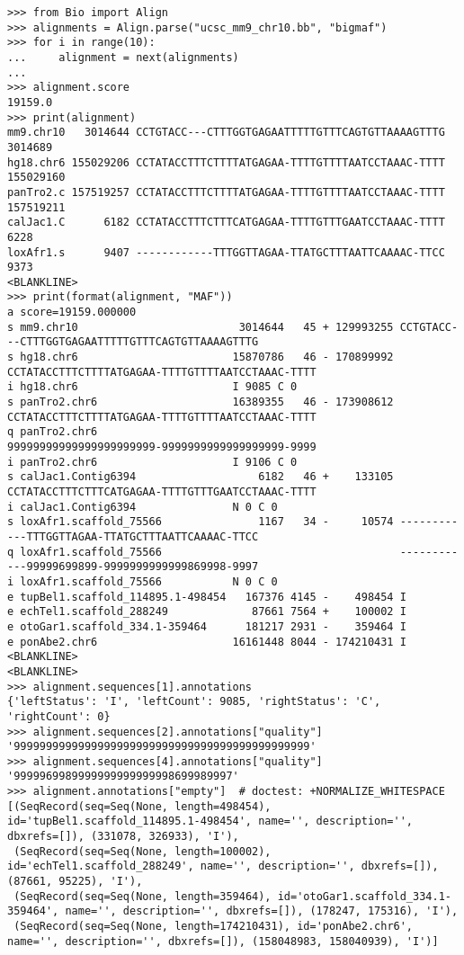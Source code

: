 \begin{verbatim}
>>> from Bio import Align
>>> alignments = Align.parse("ucsc_mm9_chr10.bb", "bigmaf")
>>> for i in range(10):
...     alignment = next(alignments)
...
>>> alignment.score
19159.0
>>> print(alignment)
mm9.chr10   3014644 CCTGTACC---CTTTGGTGAGAATTTTTGTTTCAGTGTTAAAAGTTTG   3014689
hg18.chr6 155029206 CCTATACCTTTCTTTTATGAGAA-TTTTGTTTTAATCCTAAAC-TTTT 155029160
panTro2.c 157519257 CCTATACCTTTCTTTTATGAGAA-TTTTGTTTTAATCCTAAAC-TTTT 157519211
calJac1.C      6182 CCTATACCTTTCTTTCATGAGAA-TTTTGTTTGAATCCTAAAC-TTTT      6228
loxAfr1.s      9407 ------------TTTGGTTAGAA-TTATGCTTTAATTCAAAAC-TTCC      9373
<BLANKLINE>
>>> print(format(alignment, "MAF"))
a score=19159.000000
s mm9.chr10                         3014644   45 + 129993255 CCTGTACC---CTTTGGTGAGAATTTTTGTTTCAGTGTTAAAAGTTTG
s hg18.chr6                        15870786   46 - 170899992 CCTATACCTTTCTTTTATGAGAA-TTTTGTTTTAATCCTAAAC-TTTT
i hg18.chr6                        I 9085 C 0
s panTro2.chr6                     16389355   46 - 173908612 CCTATACCTTTCTTTTATGAGAA-TTTTGTTTTAATCCTAAAC-TTTT
q panTro2.chr6                                               99999999999999999999999-9999999999999999999-9999
i panTro2.chr6                     I 9106 C 0
s calJac1.Contig6394                   6182   46 +    133105 CCTATACCTTTCTTTCATGAGAA-TTTTGTTTGAATCCTAAAC-TTTT
i calJac1.Contig6394               N 0 C 0
s loxAfr1.scaffold_75566               1167   34 -     10574 ------------TTTGGTTAGAA-TTATGCTTTAATTCAAAAC-TTCC
q loxAfr1.scaffold_75566                                     ------------99999699899-9999999999999869998-9997
i loxAfr1.scaffold_75566           N 0 C 0
e tupBel1.scaffold_114895.1-498454   167376 4145 -    498454 I
e echTel1.scaffold_288249             87661 7564 +    100002 I
e otoGar1.scaffold_334.1-359464      181217 2931 -    359464 I
e ponAbe2.chr6                     16161448 8044 - 174210431 I
<BLANKLINE>
<BLANKLINE>
>>> alignment.sequences[1].annotations
{'leftStatus': 'I', 'leftCount': 9085, 'rightStatus': 'C', 'rightCount': 0}
>>> alignment.sequences[2].annotations["quality"]
'9999999999999999999999999999999999999999999999'
>>> alignment.sequences[4].annotations["quality"]
'9999969989999999999999998699989997'
>>> alignment.annotations["empty"]  # doctest: +NORMALIZE_WHITESPACE
[(SeqRecord(seq=Seq(None, length=498454), id='tupBel1.scaffold_114895.1-498454', name='', description='', dbxrefs=[]), (331078, 326933), 'I'),
 (SeqRecord(seq=Seq(None, length=100002), id='echTel1.scaffold_288249', name='', description='', dbxrefs=[]), (87661, 95225), 'I'),
 (SeqRecord(seq=Seq(None, length=359464), id='otoGar1.scaffold_334.1-359464', name='', description='', dbxrefs=[]), (178247, 175316), 'I'),
 (SeqRecord(seq=Seq(None, length=174210431), id='ponAbe2.chr6', name='', description='', dbxrefs=[]), (158048983, 158040939), 'I')]
\end{verbatim}

